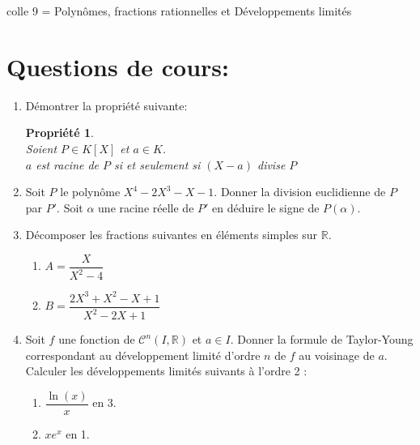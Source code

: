\documentclass[a4paper,10pt]{article}
\newtheorem*{pro}{Propriété}
\theoremstyle{definition}
\theoremstyle{definition}
\newcommand{\R}{\mathbb{R}}
\begin{document}
	
	
	\begin{center}
		\Large \sc colle 9 = Polynômes, fractions rationnelles et Développements limités
	\end{center}
	
\section *{Questions de cours:}

\begin{enumerate} 


\item Démontrer la propriété suivante:
\begin{pro}\hfil\\
Soient $P\in K[X]$ et $a\in K$.\\
$a$ est racine de $P$ si et seulement si $(X-a)$ divise $P$
\end{pro}
\item Soit $P$ le polynôme $X^4-2X^3-X-1$. Donner la division euclidienne de $P$ par $P'$. Soit $\alpha$ une racine réelle de $P'$ en déduire le signe de $P(\alpha)$.
\item Décomposer les fractions suivantes en éléments simples sur $\R$.
\begin{multicols}{2}
\begin{enumerate}[$\square$]
\item $A = \dfrac{X}{X^2-4}$
\item$B = \dfrac{2X^3+X^2-X+1}{X^2-2X+1}$
\end{enumerate}
\end{multicols}
\item Soit $f$ une fonction de $\mathcal{C}^n\left(I,\R\right)$ et $a\in I$. Donner la formule de Taylor-Young correspondant au développement limité d'ordre $n$ de $f$  au voisinage de $a$. Calculer les développements limités suivants à l’ordre 2 :
\begin{multicols}{2}
\begin{enumerate}[$\square$]
\item $\dfrac{\ln(x)}{x}$ en 3.
\item $xe^x$ en 1.
\end{enumerate}
\end{multicols}
\end{enumerate}
\end{document}
